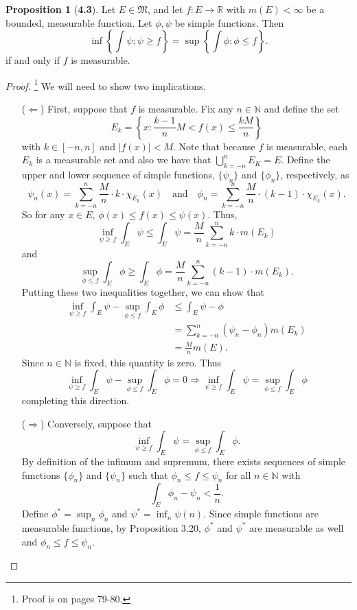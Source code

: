 \documentclass[12pt]{article}
\newcommand{\R}{\mathbb{R}}
\newcommand{\N}{\mathbb{N}}
\theoremstyle{definition}
\newtheorem*{prop}{Proposition}
\begin{document}
\begin{prop}[\textbf{4.3}]
  Let \( E \in \mathfrak{M} \), and let \( f: E \to \R \) with \( m(E) < \infty \) be a bounded, measurable function. Let \( \phi, \psi \) be simple functions. Then
      \[
          \inf \left\{ \int \psi: \psi \geq f \right\} = \sup \left\{ \int \phi : \phi \leq f \right\}.  
      \] 
  if and only if \( f \) is measurable. 

\begin{proof}\footnote{Proof is on pages 79-80.}
  We will need to show two implications.
  \begin{enumerate}
    \item[(\(\Leftarrow\))] First, suppose that \( f \) is measurable. 
    Fix any \( n \in \N \) and define the set 
      \[ 
         E_k = \left\{x: \frac{k-1}{n} M < f(x) \leq \frac{kM}{n} \right\}
      \]
    with \( k \in [-n, n] \) and \( |f(x)| < M \). Note that because \( f \) is measurable, each \( E_k \) is a measurable set and also we have that \( \displaystyle \bigcup_{k = -n}^{n} E_K = E \). 
    Define the upper and lower sequence of simple functions, \( \{\psi_n\} \) and \( \{\phi_n\} \), respectively, as 
      \[
          \psi_n (x) = \sum_{k=-n}^{n} \frac{M}{n} \cdot k \cdot \chi_{E_{k}}(x) 
          \quad \text{and} \quad
          \phi_n = \sum_{k=-n}^{n} \frac{M}{n} \cdot (k-1) \cdot \chi_{E_{k}}(x).
      \]
    So for any \( x \in E \), \( \phi(x) \leq f(x) \leq \psi(x) \). Thus,
      \[
        \inf_{\psi \geq f} \int_{E} \psi \leq \int_{E} \psi = \frac{M}{n}  \sum_{k=-n}^{n} k \cdot m(E_k) 
      \]
    and 
      \[
          \sup_{\phi \leq f} \int_{E} \phi \geq \int_{E} \phi = \frac{M}{n} \sum_{k=-n}^{n} (k-1) \cdot m(E_k).
      \]
    Putting these two inequalities together, we can show that 
      \begin{align*}
        \inf_{\psi \geq f} \int_{E} \psi  - \sup_{\phi \leq f} \int_{E} \phi &\leq \int_{E} \psi - \phi  \\
        &= \sum_{k=-n}^{n} \left( \psi_n - \phi_n \right) m(E_k) \\
        &= \frac{M}{n} m(E).
      \end{align*}
    Since \( n \in \N \) is fixed, this quantity is zero. Thus
      \[
        \inf_{\psi \geq f} \int_{E} \psi  - \sup_{\phi \leq f} \int_{E} \phi = 0 \Rightarrow \inf_{\psi \geq f} \int_{E} \psi  = \sup_{\phi \leq f} \int_{E} \phi
      \]
    completing this direction. 
    \item[(\( \Rightarrow \))] Conversely, suppose that 
        \[
          \inf_{\psi \geq f} \int_{E} \psi  = \sup_{\phi \leq f} \int_{E} \phi.
        \]
      By definition of the infimum and supremum, there exists sequences of simple functions \( \{ \phi_n\} \) and \( \{ \psi_n\} \) 
      such that \( \phi_n \leq f \leq \psi_n \) for all \( n \in \N \) with 
        \[
            \int_{E} \phi_n - \psi_n < \frac{1}{n}.
        \]
      Define \( \displaystyle \phi^{*} = \sup_{n} \phi_{n} \) and \( \displaystyle \psi^{*} = \inf_{n} \psi(n) \). 
      Since simple functions are measurable functions, by Proposition 3.20, \( \phi^{*} \) and \( \psi^{*} \) are measurable as well and \( \phi_n \leq f \leq \psi_n \).


\end{enumerate}
\end{proof}
\end{prop}
\end{document}
